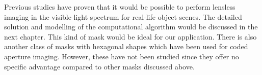 Previous studies\cite{Toeplitz}\cite{VBoomi}\cite{Flatcam} have proven that it would be possible to perform lensless imaging  in the visible light spectrum for real-life object scenes. The detailed solution and modelling of the computational algorithm would be discussed in the next chapter. This kind of mask would be ideal for our application. There is also another class of masks with hexagonal shapes\cite{hexagonal}\cite{hexagonal2} which have been used for coded aperture imaging. However, these have not been studied since they offer no specific advantage compared to other masks discussed above.